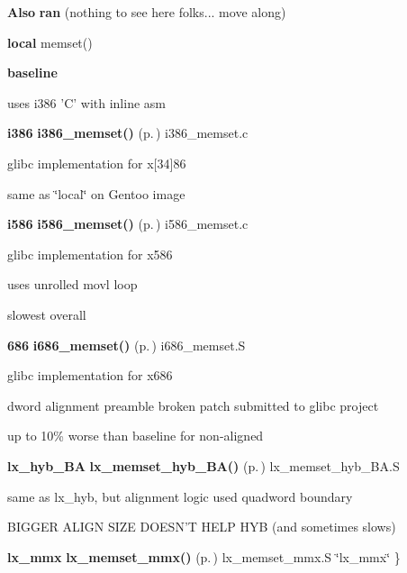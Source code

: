 {\bf Also} {\bf ran} (nothing to see here folks... move along)\begin{CompactItemize}
\item 
{\bf local} memset() \begin{CompactItemize}
\item 
{\bf baseline}\item 
uses i386 'C' with inline asm\end{CompactItemize}
\item 
{\bf i386} {\bf i386\_\-memset()} {\rm (p.\,\pageref{memset_2def__test_8h_a1})} i386\_\-memset.c\begin{CompactItemize}
\item 
glibc implementation for x[34]86\item 
same as \char`\"{}local\char`\"{} on Gentoo image\end{CompactItemize}
\item 
{\bf i586} {\bf i586\_\-memset()} {\rm (p.\,\pageref{memset_2def__test_8h_a2})} i586\_\-memset.c\begin{CompactItemize}
\item 
glibc implementation for x586\item 
uses unrolled movl loop\item 
slowest overall\end{CompactItemize}
\item 
{\bf 686} {\bf i686\_\-memset()} {\rm (p.\,\pageref{memset_2def__test_8h_a3})} i686\_\-memset.S\begin{CompactItemize}
\item 
glibc implementation for x686\item 
dword alignment preamble broken patch submitted to glibc project\item 
up to 10\% worse than baseline for non-aligned\end{CompactItemize}
\item 
{\bf lx\_\-hyb\_\-BA} {\bf lx\_\-memset\_\-hyb\_\-BA()} {\rm (p.\,\pageref{memset_2def__test_8h_a8})} lx\_\-memset\_\-hyb\_\-BA.S\begin{CompactItemize}
\item 
same as lx\_\-hyb, but alignment logic used quadword boundary\item 
BIGGER ALIGN SIZE DOESN'T HELP HYB (and sometimes slows)\end{CompactItemize}
\item 
{\bf lx\_\-mmx} {\bf lx\_\-memset\_\-mmx()} {\rm (p.\,\pageref{memset_2def__test_8h_a9})} lx\_\-memset\_\-mmx.S \char`\"{}lx\_\-mmx\char`\"{} \}\begin{CompactItemize}

\end{CompactItemize}
\end{CompactItemize}
